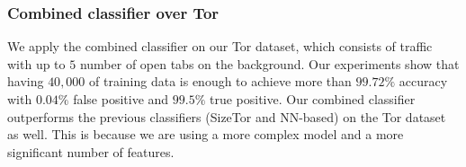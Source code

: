 \subsubsection{Combined classifier over Tor}

We apply the combined classifier on our Tor dataset, which consists of \bc traffic with up to $5$ number of open tabs on the background. Our experiments show that having $40,000$ of training data is enough to achieve more than $99.72\%$ accuracy with $0.04\%$ false positive and $99.5\%$ true positive. Our combined classifier outperforms the previous classifiers (SizeTor and NN-based) on the Tor dataset as well. This is because we are using a more complex model and a more significant number of features.


\begin{comment}
\begin{table}
\center \caption{Result of combined classifier over Tor.}\label{tab:comb_t}
\begin{tabular}{|c|c|c|c|}
\hline
 Training size& False positive ($\%$) &True positive ($\%$)&Accuracy ($\%$)\\
      \hline
    $1000$    &$0.22$   & $71.36$   & $83.95$\\%

	$5000$    &$0.79$   & $99.91$   & $99.6$\\%
	$10,000$  &$0.0$   & $99.91$   & $99.95$\\%
	$20,000$  &$0.0$  & $99.76$   & $99.84$\\%
\hline
\end{tabular}
\end{table}

\end{comment}








